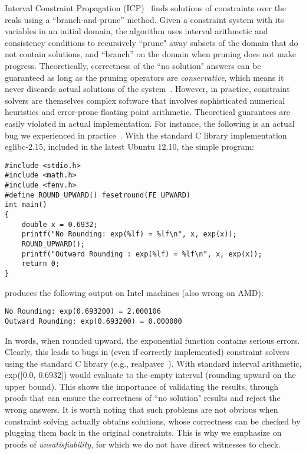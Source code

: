 \documentclass[12pt]{article}
\begin{document}
Interval Constraint Propagation (ICP)~\cite{handbookICP} finds solutions of constraints over the reals using a ``branch-and-prune'' method. Given a constraint system with its variables in an initial domain, the algorithm uses interval arithmetic and consistency conditions to recursively ``prune" away subsets of the domain that do not contain solutions, and ``branch'' on the domain when pruning does not make progress. Theoretically, correctness of the ``no solution" answers can be guaranteed as long as the pruning operators are {\em conservative}, which means it never discards actual solutions of the system~\cite{handbookICP,DBLP:conf/cade/GaoAC12}. However, in practice, constraint solvers are themselves complex software that involves sophisticated numerical heuristics and error-prone floating point arithmetic. Theoretical guarantees are easily violated in actual implementation. For instance, the following is an actual bug we experienced in practice~\cite{bug}. With the standard C library implementation {\sf eglibc-2.15}, included in the latest {\sf Ubuntu 12.10}, the simple program:
\begin{verbatim}
#include <stdio.h>
#include <math.h>
#include <fenv.h>
#define ROUND_UPWARD() fesetround(FE_UPWARD)
int main()
{
    double x = 0.6932;
    printf("No Rounding: exp(%lf) = %lf\n", x, exp(x));
    ROUND_UPWARD(); 
    printf("Outward Rounding : exp(%lf) = %lf\n", x, exp(x));
    return 0;
}
\end{verbatim}
produces the following output on Intel machines (also wrong on AMD):
\begin{verbatim}
No Rounding: exp(0.693200) = 2.000106
Outward Rounding: exp(0.693200) = 0.000000
\end{verbatim}
In words, when rounded upward, the exponential function contains serious errors. Clearly, this leads to bugs in (even if correctly implemented) constraint solvers using the standard C library (e.g., {\sf realpaver}~\cite{realpaver_paper}). With standard interval arithmetic, {\sf exp([0.0, 0.6932])} would evaluate to the empty interval (rounding upward on the upper bound). This shows the importance of validating the results, through proofs that can ensure the correctness of ``no solution" results and reject the wrong answers. It is worth noting that such problems are not obvious when constraint solving actually obtains solutions, whose correctness can be checked by plugging them back in the original constraints. This is why we emphasize on proofs of {\em unsatisfiability}, for which we do not have direct witnesses to check. 
\end{document}
